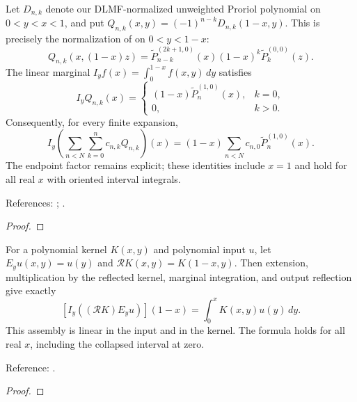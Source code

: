\begin{theorem}
\label{thm:proriol-volterra-marginal}
\leanok
Let $D_{n,k}$ denote our DLMF-normalized unweighted Proriol polynomial on
$0<y<x<1$, and put
$Q_{n,k}(x,y)=(-1)^{n-k}D_{n,k}(1-x,y)$.
This is precisely the normalization of \cite{gutleb-olver} on $0<y<1-x$:
\[
 Q_{n,k}(x,(1-x)z)=\widetilde P_{n-k}^{(2k+1,0)}(x)
 (1-x)^k\widetilde P_k^{(0,0)}(z).
\]
The linear marginal $I_yf(x)=\int_0^{1-x}f(x,y)\,dy$ satisfies
\[
 I_yQ_{n,k}(x)=
 \begin{cases}(1-x)\widetilde P_n^{(1,0)}(x),&k=0,\\0,&k>0.\end{cases}
\]
Consequently, for every finite expansion,
\[
 I_y\!\left(\sum_{n<N}\sum_{k=0}^n c_{n,k}Q_{n,k}\right)(x)
 =(1-x)\sum_{n<N}c_{n,0}\widetilde P_n^{(1,0)}(x).
\]
The endpoint factor remains explicit; these identities include $x=1$ and
hold for all real $x$ with oriented interval integrals.

References: \cite[Section 3.1]{gutleb-olver};
\cite[Section 2.3]{gutleb-thesis}.
\end{theorem}
\begin{proof}
\leanok
\end{proof}

\begin{theorem}
\label{thm:volterra-polynomial-assembly}
\leanok
For a polynomial kernel $K(x,y)$ and polynomial input $u$, let
$E_yu(x,y)=u(y)$ and $\mathcal RK(x,y)=K(1-x,y)$.
Then extension, multiplication by the reflected kernel, marginal integration,
and output reflection give exactly
\[
 [I_y((\mathcal RK)E_yu)](1-x)
 =\int_0^x K(x,y)u(y)\,dy.
\]
This assembly is linear in the input and in the kernel. The formula holds
for all real $x$, including the collapsed interval at zero.


Reference: \cite[Sections 3.1--3.2]{gutleb-olver}.
\end{theorem}
\begin{proof}
\leanok
\end{proof}

